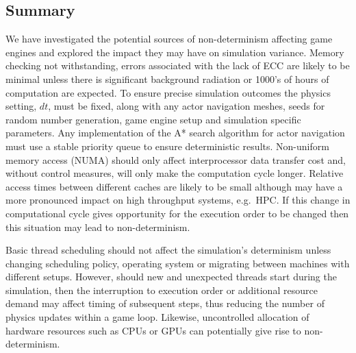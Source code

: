 



\subsection{Summary}
We have investigated the potential sources of non-determinism affecting game engines and explored the impact they may have on simulation variance. Memory checking not withstanding, errors associated with the lack of ECC are likely to be minimal unless there is significant background radiation or 1000's of hours of computation are expected. To ensure precise simulation outcomes the physics setting, $dt$, must be fixed, along with any actor navigation meshes, seeds for random number generation, game engine setup and simulation specific parameters. %
%
Any implementation of the A* search algorithm for actor navigation must use a stable priority queue to ensure deterministic results. 
%
Non-uniform memory access (NUMA) should only affect interprocessor data transfer cost and, without control measures, will only make the computation cycle longer. Relative access times between different caches are likely to be small although may have a more pronounced impact on high throughput systems, e.g.\ HPC. If this change in computational cycle gives opportunity for the execution order to be changed then this situation may lead to non-determinism. 

Basic thread scheduling should not affect the simulation's determinism unless changing scheduling policy, operating system or migrating between machines with different setups. However, should new and unexpected threads start during the simulation, then the interruption to execution order or additional resource demand may affect timing of subsequent steps, thus reducing the number of physics updates within a game loop. Likewise, uncontrolled allocation of hardware resources such as CPUs or GPUs can potentially give rise to non-determinism. 


